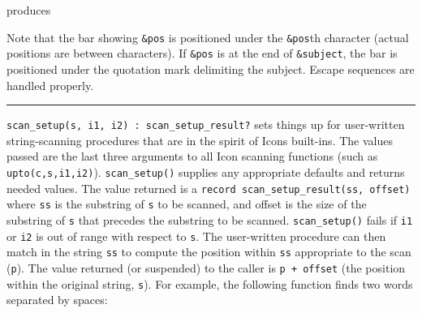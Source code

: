 \noindent produces


Note that the bar showing \texttt{\&pos} is positioned under the
\texttt{\&pos{\textquotesingle}}th character (actual positions are
between characters). If \texttt{\&pos} is at the end of
\texttt{\&subject}, the bar is positioned under the quotation mark
delimiting the subject. Escape sequences are handled properly. 



\vspace{0.25cm}\hrule{}

\texttt{scan\_setup(s, i1, i2) : scan\_setup\_result?} sets things up
for user-written string-scanning procedures that are in the spirit of
Icon{\textquotesingle}s built-ins. The values passed are the last three
arguments to all Icon scanning functions (such as
\texttt{upto(c,s,i1,i2)}). \texttt{scan\_setup()} supplies any
appropriate defaults and returns needed values. The value returned is a
\texttt{record scan\_setup\_result(ss, offset)}
where \texttt{ss} is the substring of \texttt{s} to be scanned, and
offset is the size of the substring of \texttt{s} that precedes the
substring to be scanned. \texttt{scan\_setup()} fails if \texttt{i1} or
\texttt{i2} is out of range with respect to \texttt{s}. The
user-written procedure can then match in the string \texttt{ss} to
compute the position within \texttt{ss} appropriate to the scan
(\texttt{p}). The value returned (or suspended) to the caller is
\texttt{p + offset} (the position within the original string,
\texttt{s}). For example, the following function finds two words
separated by spaces:

